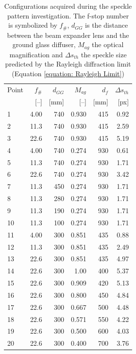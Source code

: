 \begin{table}[h]
    \centering
    \caption[Test matrix of the directed speckle investigation]{Configurations acquired during the speckle pattern investigation. The f-stop number is symbolized by $f_\#$, $d_{GG}$ is the distance between the beam expander lens and the ground glass
    diffuser, $M_{ag}$ the optical magnification and
    $\Delta s_{th}$ the speckle size predicted by the Rayleigh diffraction limit
    (Equation \ref{equation: Rayleigh Limit})}
    \label{tab: speckle investigation matrix}
    \begin{tabular}{lrrrrr}
        \toprule
        Point & $f_\#$ & $d_{GG}$ & $M_{ag}$ & $d_f$ & $\Delta s_{th}$ \\
              & [--]   & [mm]     & [--] & [mm] & [px] \\
        \midrule
         1 &  4.00 & 740 & 0.930 & 415 & 0.92 \\
         2 & 11.3 & 740 & 0.930 & 415 & 2.59 \\
         3 & 22.6 & 740 & 0.930 & 415 & 5.19 \\
         4 &  4.00 & 740 & 0.274 & 930 & 0.61 \\
         5 & 11.3 & 740 & 0.274 & 930 & 1.71 \\
         6 & 22.6 & 740 & 0.274 & 930 & 3.42 \\
         7 & 11.3 & 450 & 0.274 & 930 & 1.71 \\
         8 & 11.3 & 280 & 0.274 & 930 & 1.71 \\
         9 & 11.3 & 190 & 0.274 & 930 & 1.71 \\
        10 & 11.3 & 100 & 0.274 & 930 & 1.71 \\
        11 &  4.00 & 300 & 0.851 & 435 & 0.88 \\
        12 & 11.3 & 300 & 0.851 & 435 & 2.49 \\
        13 & 22.6 & 300 & 0.851 & 435 & 4.97 \\
        \midrule
        14 & 22.6 & 300 & 1.00 &  400 & 5.37 \\
        15 & 22.6 & 300 & 0.909 &  420 & 5.13 \\
        16 & 22.6 & 300 & 0.800 &  450 & 4.84 \\
        17 & 22.6 & 300 & 0.667 &  500 & 4.48 \\
        18 & 22.6 & 300 & 0.571 &  550 & 4.22 \\
        19 & 22.6 & 300 & 0.500 &  600 & 4.03 \\
        20 & 22.6 & 300 & 0.400 &  700 & 3.76 \\

\end{tabular}
\end{table}
